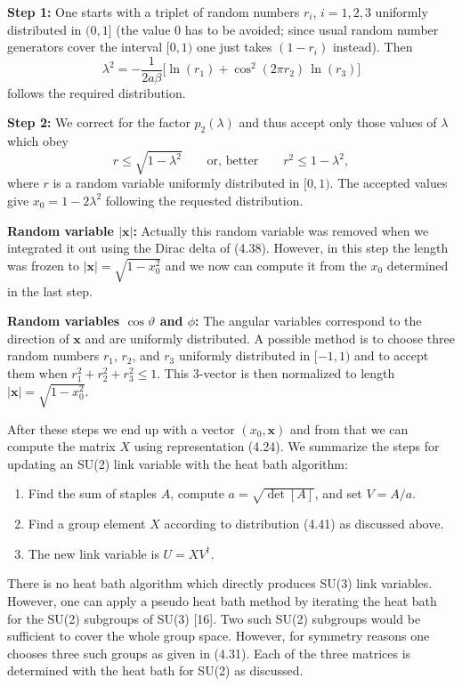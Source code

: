\textbf{Step 1:} One starts with a triplet of random numbers $r_i$, $i = 1, 2, 3$
uniformly distributed in $(0,1]$ (the value 0 has to be avoided; since usual
random number generators cover the interval $[0,1)$ one just takes $(1-r_i)$
instead). Then
\begin{equation}
  \lambda^2 = -\frac{1}{2a\beta}\Big[\ln(r_1) + \cos^2(2\pi r_2)\,\ln(r_3)\Big]
\end{equation}
follows the required distribution.

\textbf{Step 2:} We correct for the factor $p_2(\lambda)$ and thus accept only those
values of $\lambda$ which obey
\begin{equation}
  r \leq \sqrt{1-\lambda^2} \qquad \text{or, better} \qquad r^2 \leq 1-\lambda^2,
\end{equation}
where $r$ is a random variable uniformly distributed in $[0,1)$. The accepted
values give $x_0 = 1 - 2\lambda^2$ following the requested distribution.

\textbf{Random variable $|\mathbf{x}|$:} Actually this random variable was removed when we
integrated it out using the Dirac delta of (4.38). However, in this step the
length was frozen to $|\mathbf{x}| = \sqrt{1-x_0^2}$ and we now can compute it from the
$x_0$ determined in the last step.

\textbf{Random variables $\cos\vartheta$ and $\phi$:} The angular variables correspond to the
direction of $\mathbf{x}$ and are uniformly distributed. A possible method is to
choose three random numbers $r_1$, $r_2$, and $r_3$ uniformly distributed in
$[-1,1)$ and to accept them when $r_1^2+r_2^2+r_3^2 \leq 1$. This 3-vector is then normalized to length $|\mathbf{x}| = \sqrt{1-x_0^2}$.

After these steps we end up with a vector $(x_0, \mathbf{x})$ and from that we can
compute the matrix $X$ using representation (4.24). We summarize the steps
for updating an SU(2) link variable with the heat bath algorithm:
\begin{enumerate}
  \item Find the sum of staples $A$, compute $a = \sqrt{\det[A]}$, and set $V = A/a$.
  \item Find a group element $X$ according to distribution (4.41) as discussed
        above.
  \item The new link variable is $U = X V^\dagger$.
\end{enumerate}

There is no heat bath algorithm which directly produces SU(3) link variables. However, one can apply a pseudo heat bath method by iterating the
heat bath for the SU(2) subgroups of SU(3) [16]. Two such SU(2) subgroups
would be sufficient to cover the whole group space. However, for symmetry
reasons one chooses three such groups as given in (4.31). Each of the three
matrices is determined with the heat bath for SU(2) as discussed.

